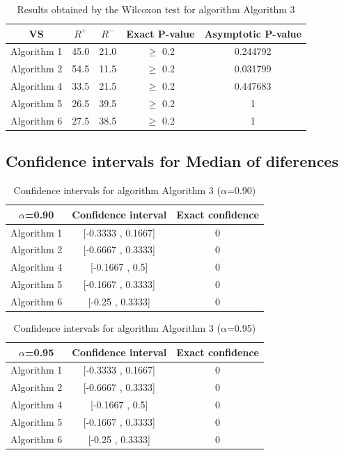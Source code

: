 \documentclass[a4paper,10pt]{article}
\begin{document}
\begin{table}[!htp]
\centering\small
\begin{tabular}{
|c|c|c|c|c|}
\hline
 VS & $R^{+}$ & $R^{-}$ & Exact P-value & Asymptotic P-value \\ \hline 
Algorithm 1 & 45.0 & 21.0 & $\geq$ 0.2 & 0.244792\\ \hline 
Algorithm 2 & 54.5 & 11.5 & $\geq$ 0.2 & 0.031799\\ \hline 
Algorithm 4 & 33.5 & 21.5 & $\geq$ 0.2 & 0.447683\\ \hline 
Algorithm 5 & 26.5 & 39.5 & $\geq$ 0.2 & 1\\ \hline 
Algorithm 6 & 27.5 & 38.5 & $\geq$ 0.2 & 1\\ \hline 

\end{tabular}
\caption{Results obtained by the Wilcoxon test for algorithm Algorithm 3}
\end{table}

\subsection{Confidence intervals for Median of diferences}

\begin{table}[!htp]
\centering\small
\begin{tabular}{
|c|c|c|}
\hline
 $\alpha$=0.90 & Confidence interval & Exact confidence \\ \hline 
Algorithm 1 & [-0.3333 , 0.1667] & 0\\ \hline 
Algorithm 2 & [-0.6667 , 0.3333] & 0\\ \hline 
Algorithm 4 & [-0.1667 , 0.5] & 0\\ \hline 
Algorithm 5 & [-0.1667 , 0.3333] & 0\\ \hline 
Algorithm 6 & [-0.25 , 0.3333] & 0\\ \hline 

\end{tabular}
\caption{Confidence intervals for algorithm Algorithm 3 ($\alpha$=0.90)}
\end{table}
\begin{table}[!htp]
\centering\small
\begin{tabular}{
|c|c|c|}
\hline
 $\alpha$=0.95 & Confidence interval & Exact confidence \\ \hline 
Algorithm 1 & [-0.3333 , 0.1667] & 0\\ \hline 
Algorithm 2 & [-0.6667 , 0.3333] & 0\\ \hline 
Algorithm 4 & [-0.1667 , 0.5] & 0\\ \hline 
Algorithm 5 & [-0.1667 , 0.3333] & 0\\ \hline 
Algorithm 6 & [-0.25 , 0.3333] & 0\\ \hline 

\end{tabular}
\caption{Confidence intervals for algorithm Algorithm 3 ($\alpha$=0.95)}
\end{table}
\end{document}
